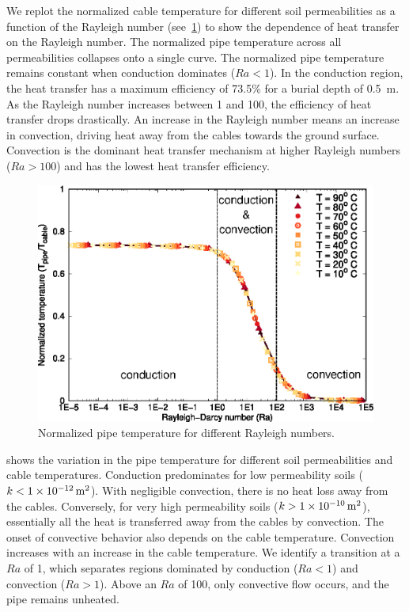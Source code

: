 \documentclass[Journal,letterpaper,InsideFigs]{ascelike-new}
\begin{document}
We replot the normalized cable temperature for different soil permeabilities as a function of the Rayleigh number (see~\cref{fig:ra-temp}) to show the dependence of heat transfer on the Rayleigh number. The normalized pipe temperature across all permeabilities collapses onto a single curve. The normalized pipe temperature remains constant when conduction dominates ($Ra < 1$). In the conduction region, the heat transfer has a maximum efficiency of 73.5\% for a burial depth of \SI{0.5}{\meter}. As the Rayleigh number increases between 1 and 100, the efficiency of heat transfer drops drastically. An increase in the Rayleigh number means an increase in convection, driving heat away from the cables towards the ground surface. Convection is the dominant heat transfer mechanism at higher Rayleigh numbers ($Ra > 100$) and has the lowest heat transfer efficiency. 

\begin{figure}
    \centering
    \includegraphics{figs/ra-dt.eps}
    \caption{Normalized pipe temperature for different Rayleigh numbers.}
    \label{fig:ra-temp}
\end{figure}

 shows the variation in the pipe temperature for different soil permeabilities and cable temperatures. Conduction predominates for low permeability soils ($k < \SI{1E-12}{\meter\squared}$). With negligible convection, there is no heat loss away from the cables. Conversely, for very high permeability soils ($k > \SI{1E-10}{\meter\squared}$), essentially all the heat is transferred away from the cables by convection. The onset of convective behavior also depends on the cable temperature. Convection increases with an increase in the cable temperature. We identify a transition at a $Ra$ of 1, which separates regions dominated by conduction ($Ra < 1$) and convection ($Ra > 1$). Above an $Ra$ of 100, only convective flow occurs, and the pipe remains unheated. 
\end{document}
